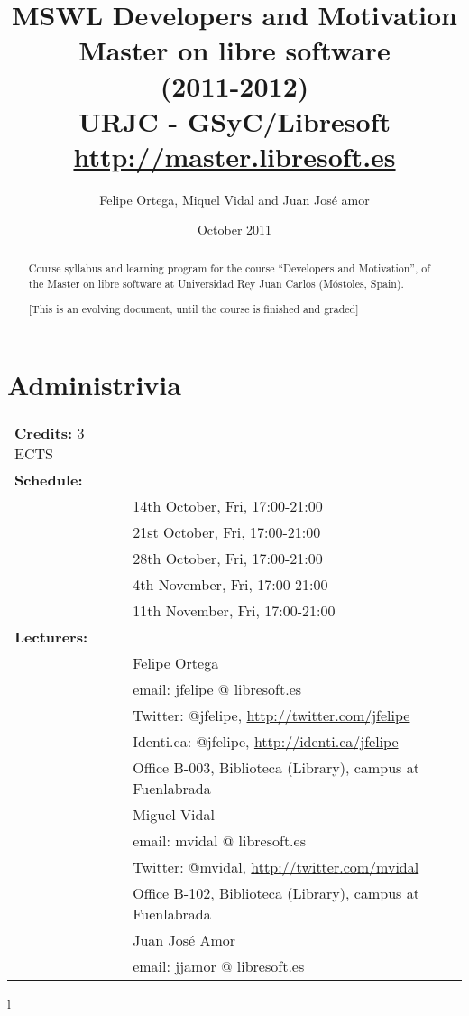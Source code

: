 \documentclass[a4paper]{article}
\title{MSWL Developers and Motivation \\
Master on libre software \\
(2011-2012) \\
URJC - GSyC/Libresoft \\
\url{http://master.libresoft.es}}
\author{Felipe Ortega, Miquel Vidal and Juan José amor}
\date{October 2011}
\begin{document}
\maketitle

\begin{abstract}
Course syllabus and learning program for the course ``Developers and Motivation'', of the Master on libre software at Universidad Rey Juan Carlos (Móstoles, Spain).

[This is an evolving document, until the course is finished and graded]
\end{abstract}

\tableofcontents

\section{Administrivia}

\begin{tabular}{ll}
\textbf{Credits:} 3 ECTS \\
\textbf{Schedule:} \\
& 14th October, Fri, 17:00-21:00 \\
& 21st October, Fri, 17:00-21:00 \\
& 28th October, Fri, 17:00-21:00 \\
& 4th November, Fri, 17:00-21:00 \\
& 11th November, Fri, 17:00-21:00 \\
\textbf{Lecturers:} \\
& Felipe Ortega \\
& \hspace{1cm} email: jfelipe @ libresoft.es \\
& \hspace{1cm} Twitter: @jfelipe, \url{http://twitter.com/jfelipe} \\
& \hspace{1cm} Identi.ca: @jfelipe, \url{http://identi.ca/jfelipe} \\
& \hspace{1cm} Office B-003, Biblioteca (Library), campus at Fuenlabrada \\
& Miguel Vidal \\
& \hspace{1cm} email: mvidal @ libresoft.es \\
& \hspace{1cm} Twitter: @mvidal, \url{http://twitter.com/mvidal} \\
& \hspace{1cm} Office B-102, Biblioteca (Library), campus at Fuenlabrada \\
& Juan José Amor \\
& \hspace{1cm} email: jjamor @ libresoft.es \\
\end{tabular}{l}
\end{document}
